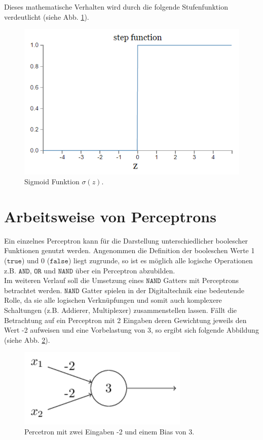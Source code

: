 \noindent
Dieses mathematische Verhalten wird durch die folgende Stufenfunktion verdeutlicht (siehe Abb. \ref{fig:perceptron_plot}).
\begin{figure}[hbt]
	\centering
	\includegraphics[scale=0.6]{Bilder/perceptron_plot}
	\caption{Sigmoid Funktion $\sigma(z)$.} 
	\label{fig:perceptron_plot} 
\end{figure}

\section{Arbeitsweise von Perceptrons}
Ein einzelnes Perceptron kann für die Darstellung unterschiedlicher boolescher Funktionen genutzt werden. Angenommen die Definition der booleschen Werte 1 ($\mathtt{true}$) und 0 ($\mathtt{false}$) liegt zugrunde, so ist es möglich alle logische Operationen z.B. $\mathtt{AND}$, $\mathtt{OR}$ und $\mathtt{NAND}$ über ein Perceptron abzubilden. \\
Im weiteren Verlauf soll die Umsetzung eines $\mathtt{NAND}$ Gatters mit Perceptrons betrachtet werden. $\mathtt{NAND}$ Gatter spielen in der Digitaltechnik eine bedeutende Rolle, da sie alle logischen Verknüpfungen und somit auch komplexere Schaltungen (z.B. Addierer, Multiplexer) zusammenstellen lassen. Fällt die Betrachtung auf ein Perceptron mit 2 Eingaben deren Gewichtung jeweils den Wert -2 aufweisen und eine Vorbelastung von 3, so ergibt sich folgende Abbildung (siehe Abb. \ref{fig:perceptron_example}).
\begin{figure}[hbt]
	\centering
	\includegraphics[scale=0.6]{Bilder/perceptron_example}
	\caption{Percetron mit zwei Eingaben -2 und einem Bias von 3.} 
	\label{fig:perceptron_example} 
\end{figure}

